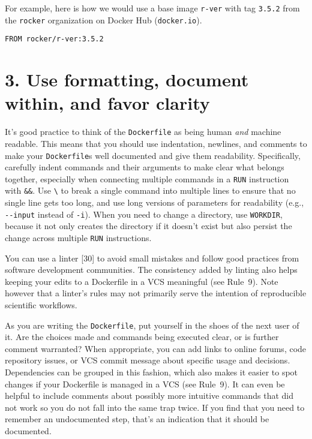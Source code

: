 \documentclass[10pt,letterpaper]{article}
\begin{document}
For example, here is how we would use a base image \texttt{r-ver} with
tag \texttt{3.5.2} from the \texttt{rocker} organization on Docker Hub
(\texttt{docker.io}).

\begin{verbatim}
FROM rocker/r-ver:3.5.2
\end{verbatim}

\hypertarget{use-formatting-document-within-and-favor-clarity}{%
\section{3. Use formatting, document within, and favor
clarity}\label{use-formatting-document-within-and-favor-clarity}}

It's good practice to think of the \texttt{Dockerfile} as being human
\emph{and} machine readable. This means that you should use indentation,
newlines, and comments to make your \texttt{Dockerfile}s well documented
and give them readability. Specifically, carefully indent commands and
their arguments to make clear what belongs together, especially when
connecting multiple commands in a \texttt{RUN} instruction with
\texttt{\&\&}. Use \texttt{\textbackslash{}} to break a single command
into multiple lines to ensure that no single line gets too long, and use
long versions of parameters for readability (e.g., \texttt{-\/-input}
instead of \texttt{-i}). When you need to change a directory, use
\texttt{WORKDIR}, because it not only creates the directory if it
doesn't exist but also persist the change across multiple \texttt{RUN}
instructions.

You can use a linter {[}30{]} to avoid small mistakes and follow good
practices from software development communities. The consistency added
by linting also helps keeping your edits to a Dockerfile in a VCS
meaningful (see Rule~9). Note however that a linter's rules may not
primarily serve the intention of reproducible scientific workflows.

As you are writing the \texttt{Dockerfile}, put yourself in the shoes of
the next user of it. Are the choices made and commands being executed
clear, or is further comment warranted? When appropriate, you can add
links to online forums, code repository issues, or VCS commit message
about specific usage and decisions. Dependencies can be grouped in this
fashion, which also makes it easier to spot changes if your Dockerfile
is managed in a VCS (see Rule~9). It can even be helpful to include
comments about possibly more intuitive commands that did not work so you
do not fall into the same trap twice. If you find that you need to
remember an undocumented step, that's an indication that it should be
documented.
\end{document}
